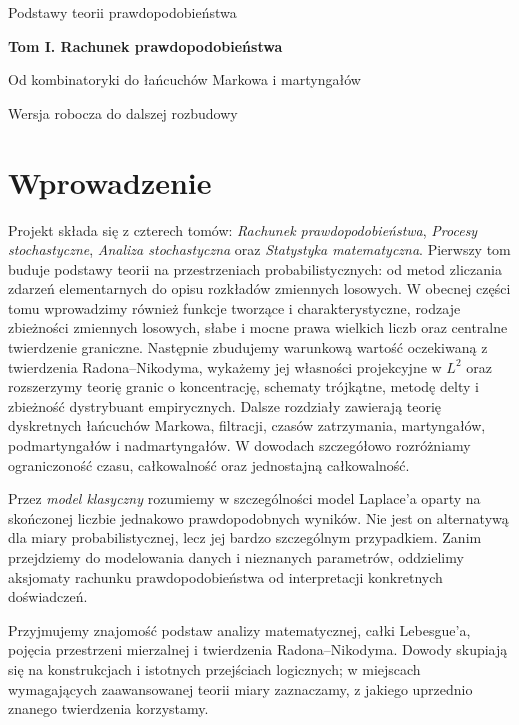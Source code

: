 \documentclass[11pt,a4paper,oneside]{report}
\numberwithin{equation}{chapter}
\theoremstyle{plain}
\theoremstyle{definition}
\theoremstyle{remark}
\begin{document}
\begin{titlepage}
\centering
\vspace*{4cm}
{\Large Podstawy teorii prawdopodobieństwa\par}
\vspace{1.0cm}
{\Huge\bfseries Tom I. Rachunek prawdopodobieństwa\par}
\vspace{0.7cm}
{\Large Od kombinatoryki do łańcuchów Markowa i martyngałów\par}
\vfill
{\large Wersja robocza do dalszej rozbudowy\par}
\vspace{1.4cm}
\end{titlepage}
\tableofcontents

\chapter*{Wprowadzenie}
Projekt składa się z czterech tomów: \emph{Rachunek prawdopodobieństwa}, \emph{Procesy stochastyczne}, \emph{Analiza stochastyczna} oraz \emph{Statystyka matematyczna}.
Pierwszy tom buduje podstawy teorii na przestrzeniach probabilistycznych:
od metod zliczania zdarzeń elementarnych do opisu rozkładów zmiennych losowych.
W obecnej części tomu wprowadzimy również funkcje tworzące i charakterystyczne,
rodzaje zbieżności zmiennych losowych, słabe i mocne prawa wielkich liczb
oraz centralne twierdzenie graniczne. Następnie zbudujemy
warunkową wartość oczekiwaną z twierdzenia Radona--Nikodyma,
wykażemy jej własności projekcyjne w $L^2$ oraz rozszerzymy
teorię granic o koncentrację, schematy trójkątne,
metodę delty i zbieżność dystrybuant empirycznych.
Dalsze rozdziały zawierają teorię dyskretnych łańcuchów Markowa,
filtracji, czasów zatrzymania, martyngałów, podmartyngałów i nadmartyngałów.
W dowodach szczegółowo rozróżniamy ograniczoność czasu,
całkowalność oraz jednostajną całkowalność.

Przez \emph{model klasyczny} rozumiemy w szczególności model
Laplace'a oparty na skończonej liczbie jednakowo prawdopodobnych
wyników. Nie jest on alternatywą dla miary probabilistycznej,
lecz jej bardzo szczególnym przypadkiem. Zanim przejdziemy do
modelowania danych i nieznanych parametrów, oddzielimy aksjomaty
rachunku prawdopodobieństwa od interpretacji konkretnych doświadczeń.

Przyjmujemy znajomość podstaw analizy matematycznej, całki Lebesgue'a,
pojęcia przestrzeni mierzalnej i twierdzenia Radona--Nikodyma.
Dowody skupiają się na konstrukcjach i istotnych przejściach logicznych;
w miejscach wymagających zaawansowanej teorii miary zaznaczamy, z jakiego
uprzednio znanego twierdzenia korzystamy.
\end{document}
